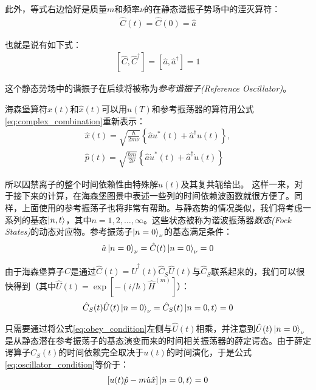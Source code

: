 此外，等式右边恰好是质量$m$和频率$\nu$的在静态谐振子势场中的湮灭算符：
\begin{align}
    \hat{C}(t)=\hat{C}(0)=\hat{a}
\end{align}

也就是说有如下式：
\begin{align}
    \left[\hat{C},\hat{C}^\dagger\right]=\left[\hat{a},\hat{a}^\dagger\right]=1
\end{align}

这个静态势场中的谐振子在后续将被称为\emph{参考谐振子(Reference Oscillator)}。

海森堡算符$\hat{x}(t)$和$\hat{x}(t)$可以用$u(T)$和参考振荡器的算符用公式\eqref{eq:complex_combination}重新表示：
\begin{align}
    \hat{x}(t)=\sqrt{\frac{\hbar}{2m\nu}}\left\{\hat{a}u^*(t)+\hat{a}^\dagger u(t)\right\},\\
    \hat{p}(t)=\sqrt{\frac{\hbar m}{2\nu}}\left\{\hat{a}\dot{u}^*(t)+\hat{a}^\dagger \dot{u}(t)\right\}
\end{align}

所以囚禁离子的整个时间依赖性由特殊解$u(t)$及其复共轭给出。
这样一来，对于接下来的计算，在海森堡图景中表述一些列的时间依赖波函数就很方便了。同样，上面使用的参考振荡子也将非常有帮助。与静态势的情况类似，我们将考虑一系列的基态$\ket{n,t}$，其中$n=1,2,\dots,\infty$。这些状态被称为谐波振荡器\emph{数态(Fock States)}的动态对应物。参考振荡子$\ket{n=0}_\nu$的基态满足条件：
\begin{align}
    \hat{a}\ket{n=0}_\nu=\hat{C}(t)\ket{n=0}_\nu=0 \label{eq:obey_condition}
\end{align}

由于海森堡算子$\hat{C}$是通过$\hat{C}(t)=\hat{U}^\dagger(t)\hat{C}_S\hat{U}(t)$与$\hat{C}_S$联系起来的，我们可以很快得到（其中$\hat{U}(t)=\exp{\left[-(i/\hbar)\hat{H}^{(m)}\right]}$）：
\begin{align}
    \hat{C}_S(t)\hat{U}(t)\ket{n=0}_\nu=\hat{C}_S(t)\ket{n=0,t}=0 \label{eq:oscillator_condition}
\end{align}

只需要通过将公式\eqref{eq:obey_condition}左侧与$\hat{U}(t)$相乘，并注意到$\hat{U}(t)\ket{n=0}_\nu$是从静态潜在参考振荡子的基态演变而来的时间相关振荡器的薛定谔态。由于薛定谔算子$C_S(t)$的时间依赖完全取决于$u(t)$的时间演化，于是公式\eqref{eq:oscillator_condition}等价于：
\begin{align}
    \left[u(t)\hat{p}-m\dot{u}\hat{x}\right]\ket{n=0,t}=0
\end{align}

